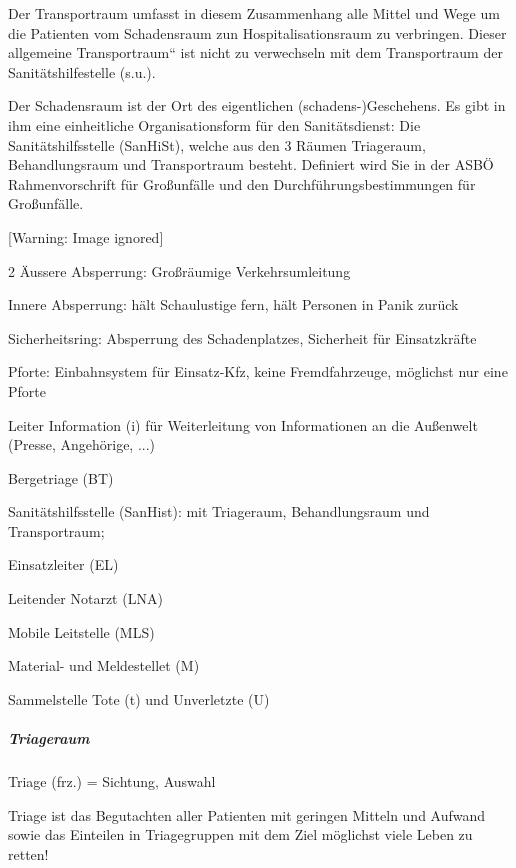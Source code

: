 \documentclass{article}
\makeatletter
\newcommand\captionof[1]{\def\@captype{#1}\caption}
\makeatother
\begin{document}
Der Transportraum umfasst in diesem Zusammenhang alle Mittel und Wege um
die Patienten vom Schadens\-raum zun Hospitalisationsraum zu
verbringen. Dieser {\quotedblbase}allgemeine
Transportraum{\textquotedblleft} ist nicht zu ver\-wechseln mit dem
Transportraum der Sanit\"atshilfestelle (s.u.).  

Der Schadensraum ist der Ort des eigentlichen (schadens-)Geschehens. Es
gibt in ihm eine einheitliche Organisations\-form f\"ur den
Sanit\"atsdienst: Die Sanit\"atshilfsstelle (SanHiSt), welche aus den 3
R\"aumen Triageraum, Behandlungsraum und Transportraum besteht.
Definiert wird Sie in der ASB\"O Rahmen\-vor\-schrift f\"ur
Gro{\ss}unf\"alle und den Durchf\"uhrungsbestimmungen f\"ur
Gro{\ss}unf\"alle. 

\begin{minipage}{12.605cm}
 [Warning: Image ignored] %
\captionof{figure}[Gliederung des Einsatzraumes]{Gliederung des
Einsatzraumes}
\begin{multicols}{2}
\"Aussere Absperrung: Gro{\ss}r\"aumige Verkehrsumleitung

Innere Absperrung: h\"alt Schaulustige fern, h\"alt Personen in Panik
zur\"uck

Sicherheitsring: Absperrung des Schadenplatzes, Sicherheit f\"ur
Einsatzkr\"afte

Pforte: Einbahnsystem f\"ur Einsatz-Kfz, keine Fremdfahrzeuge,
m\"oglichst nur eine Pforte 

Leiter Information (i) f\"ur Weiterleitung von Informationen an die
Au{\ss}enwelt (Presse, Angeh\"orige, ...)

Bergetriage (BT) 

Sanit\"atshilfsstelle (SanHist): mit Triageraum, Behandlungsraum und
Transportraum;

Einsatzleiter (EL) 

Leitender Notarzt (LNA)

Mobile Leitstelle (MLS) 

Material- und Meldestellet (M)

Sammelstelle Tote (t) und Unverletzte (U) 

\end{multicols}
\end{minipage}

\subparagraph{Triageraum}
Triage (frz.) = Sichtung, Auswahl

Triage ist das Begutachten aller Patienten mit geringen Mitteln und
Aufwand sowie das Einteilen in Triagegruppen mit dem Ziel m\"oglichst
viele Leben zu retten!
\end{document}
